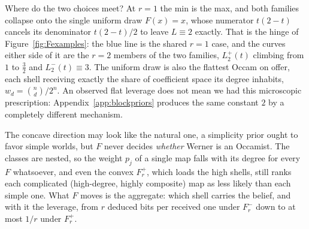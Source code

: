 \documentclass[11pt]{article}
\begin{document}
Where do the two choices meet? At $r = 1$ the min is the max,
and both families collapse onto the single uniform draw $F(x) = x$,
whose numerator $t(2-t)$ cancels its denominator $t(2-t)/2$ to leave
$L \equiv 2$ exactly. That is the hinge of
Figure~\ref{fig:Fexamples}: the blue line is the shared $r = 1$ case,
and the curves either side of it are the $r = 2$ members of the two
families, $L^+_2(t)$ climbing from $1$ to $\tfrac32$ and $L^-_2(t) \equiv 3$.
The uniform draw is also the flattest Occam on offer, each shell
receiving exactly the share of coefficient space its degree inhabits,
$w_d = \binom nd/2^n$. An observed flat leverage does not mean we had this microscopic prescription:
Appendix~\ref{app:blockpriors} produces the same constant $2$ by a completely different mechanism.

The concave direction may look like the
natural one, a simplicity prior ought to favor simple worlds, but
$F$ never decides \emph{whether} Werner is an Occamist. The classes
are nested, so the weight $p_j$ of a single map falls with its degree
for every $F$ whatsoever, and even the convex $F^+_r$, which loads the
high shells, still ranks each complicated (high-degree, highly composite) map as less likely than each simple one.
What $F$ moves is the aggregate: which shell carries the belief, and
with it the leverage, from $r$ deduced bits per received one under
$F^-_r$ down to at most $1/r$ under $F^+_r$.
\end{document}
